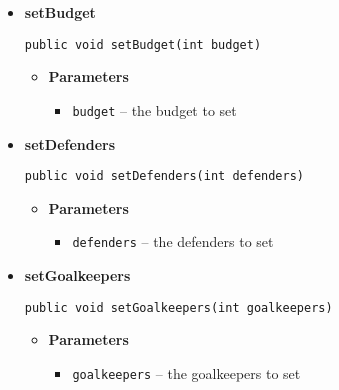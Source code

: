 \documentclass[11pt,a4paper]{report}
\begin{document}
{{{{{{{{{{\begin{itemize}
{\begin{itemize}
{Checks whether a list of players is a valid team.
}
\item{
{\bf  Parameters}
  \begin{itemize}
   \item{
\texttt{team} -- is the list of players to be checked.}
  \end{itemize}
}%
\item{{\bf  Returns} -- 
true iff the team is valid, i.e., satisfies formation and is within budget. 
}%
\end{itemize}
}%
\item{ 
{\bf  setBudget}\\
\begin{lstlisting}[frame=none]
public void setBudget(int budget)\end{lstlisting} %
\begin{itemize}
\item{
{\bf  Parameters}
  \begin{itemize}
   \item{
\texttt{budget} -- the budget to set}
  \end{itemize}
}%
\end{itemize}
}%
\item{ 
{\bf  setDefenders}\\
\begin{lstlisting}[frame=none]
public void setDefenders(int defenders)\end{lstlisting} %
\begin{itemize}
\item{
{\bf  Parameters}
  \begin{itemize}
   \item{
\texttt{defenders} -- the defenders to set}
  \end{itemize}
}%
\end{itemize}
}%
\item{ 
{\bf  setGoalkeepers}\\
\begin{lstlisting}[frame=none]
public void setGoalkeepers(int goalkeepers)\end{lstlisting} %
\begin{itemize}
\item{
{\bf  Parameters}
  \begin{itemize}
   \item{
\texttt{goalkeepers} -- the goalkeepers to set}
  \end{itemize}
}
\end{itemize}}
\end{itemize}}}}}}}}}}}
\end{document}
